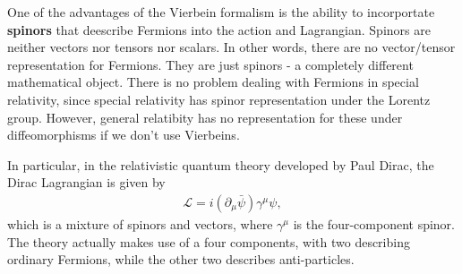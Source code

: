 \documentclass{book}
\numberwithin{equation}{section}
\theoremstyle{definition}
\newcommand{\p}{\partial}
\newcommand{\lag}{\mathcal{L}}
\begin{document}
One of the advantages of the Vierbein formalism is the ability to incorportate \textbf{spinors} that deescribe Fermions into the action and Lagrangian. Spinors are neither vectors nor tensors nor scalars. In other words, there are no vector/tensor representation for Fermions. They are just spinors - a completely different mathematical object. There is no problem dealing with Fermions in special relativity, since special relativity has spinor representation under the Lorentz group. However, general relatibity has no representation for these under diffeomorphisms if we don't use Vierbeins.

In particular, in the relativistic quantum theory developed by Paul Dirac, the Dirac Lagrangian is given by
\begin{align}
\lag = i (\p_\mu \bar{\psi})\gamma^\mu\psi,
\end{align} 
which is a mixture of spinors and vectors, where $\gamma^\mu$ is the four-component spinor. The theory actually makes use of a four components, with two describing ordinary Fermions, while the other two describes anti-particles. \\
\end{document}
